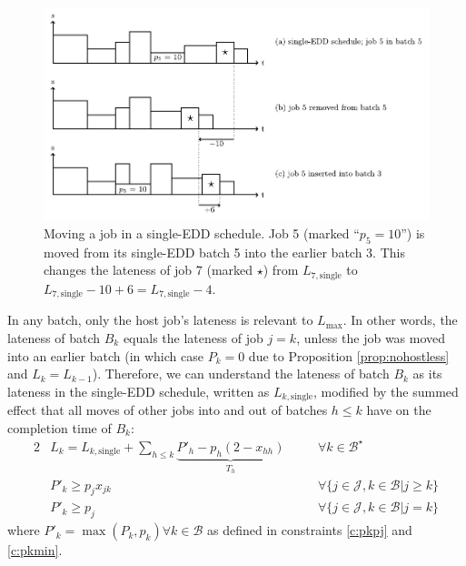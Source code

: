 \documentclass[oribibl]{llncs}
\def\Lmax{{L_{\mathrm{max}}}}
\begin{document}
\begin{figure}[th]
\centering
\includegraphics[width=\textwidth]{movebasedmip.pdf}
\caption{Moving a job in a single-EDD schedule. Job 5 (marked
``$p_5 = 10$'') is moved from its single-EDD batch 5 into the earlier batch 3.
This changes the lateness of job 7 (marked $\star$) from $L_\mathrm{7,single}$
to $L_\mathrm{7,single} - 10 + 6 = L_\mathrm{7,single} - 4$.}
  \label{fig:movebasedmip}
\end{figure}

In any batch, only the host job's lateness is relevant to $\Lmax$.
In other words, the lateness of batch $B_k$ equals the lateness of
job $j=k$, unless the job was moved into an earlier batch (in which
case $P_k = 0$ due to Proposition \ref{prop:nohostless} and $L_k = L_{k-1}$). Therefore, we can understand
the lateness of batch $B_k$ as its lateness in the single-EDD schedule, written as
$L_{k,\mathrm{single}}$, modified by the summed effect that all moves of
other jobs into and out of batches $h \leq k$ have on the completion time
of $B_k$:
\begin{alignat}{2}
  \label{c:lmaxc} & L_k = L_{k,\mathrm{single}} + \sum_{h\leq k} \underbrace{P'_h - p_h(2 -
x_{hh})}_{T_h} \quad && \forall k \in \mathcal{B}^\star\\
  \label{c:pkpj} & P'_k \geq p_j x_{jk} \quad && \forall \{j \in \mathcal{J}, k \in \mathcal{B} | j \geq k\} \\
  \label{c:pkmin} & P'_k \geq p_j \quad && \forall \{j \in \mathcal{J}, k \in \mathcal{B} | j = k\}
\end{alignat}
where $P'_k = \max(P_k, p_k) \forall k \in \mathcal{B}$ as defined in
constraints \eqref{c:pkpj} and \eqref{c:pkmin}.
\end{document}
